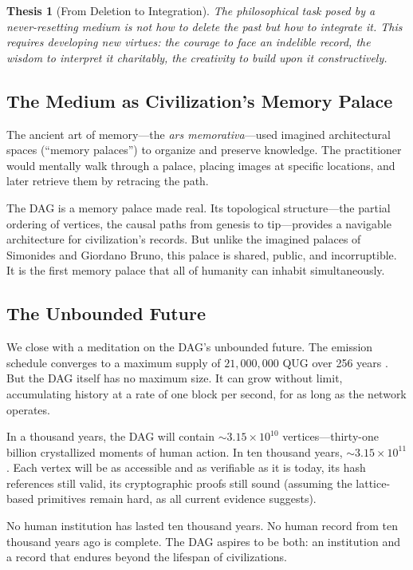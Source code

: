 \documentclass[12pt,a4paper]{article}
\theoremstyle{philosophical}
\newtheorem{thesis}{Thesis}
\begin{document}
\begin{thesis}[From Deletion to Integration]
\label{thesis:integration}
The philosophical task posed by a never-resetting medium is not how to delete the past but how to integrate it. This requires developing new virtues: the courage to face an indelible record, the wisdom to interpret it charitably, the creativity to build upon it constructively.
\end{thesis}

\subsection{The Medium as Civilization's Memory Palace}

The ancient art of memory---the \emph{ars memorativa}---used imagined architectural spaces (``memory palaces'') to organize and preserve knowledge. The practitioner would mentally walk through a palace, placing images at specific locations, and later retrieve them by retracing the path.

The DAG is a memory palace made real. Its topological structure---the partial ordering of vertices, the causal paths from genesis to tip---provides a navigable architecture for civilization's records. But unlike the imagined palaces of Simonides and Giordano Bruno, this palace is shared, public, and incorruptible. It is the first memory palace that all of humanity can inhabit simultaneously.

\subsection{The Unbounded Future}

We close with a meditation on the DAG's unbounded future. The emission schedule converges to a maximum supply of $21{,}000{,}000$ QUG over 256 years \cite{qnk-physics}. But the DAG itself has no maximum size. It can grow without limit, accumulating history at a rate of one block per second, for as long as the network operates.

In a thousand years, the DAG will contain $\sim 3.15 \times 10^{10}$ vertices---thirty-one billion crystallized moments of human action. In ten thousand years, $\sim 3.15 \times 10^{11}$. Each vertex will be as accessible and as verifiable as it is today, its hash references still valid, its cryptographic proofs still sound (assuming the lattice-based primitives remain hard, as all current evidence suggests).

No human institution has lasted ten thousand years. No human record from ten thousand years ago is complete. The DAG aspires to be both: an institution and a record that endures beyond the lifespan of civilizations.
\end{document}
